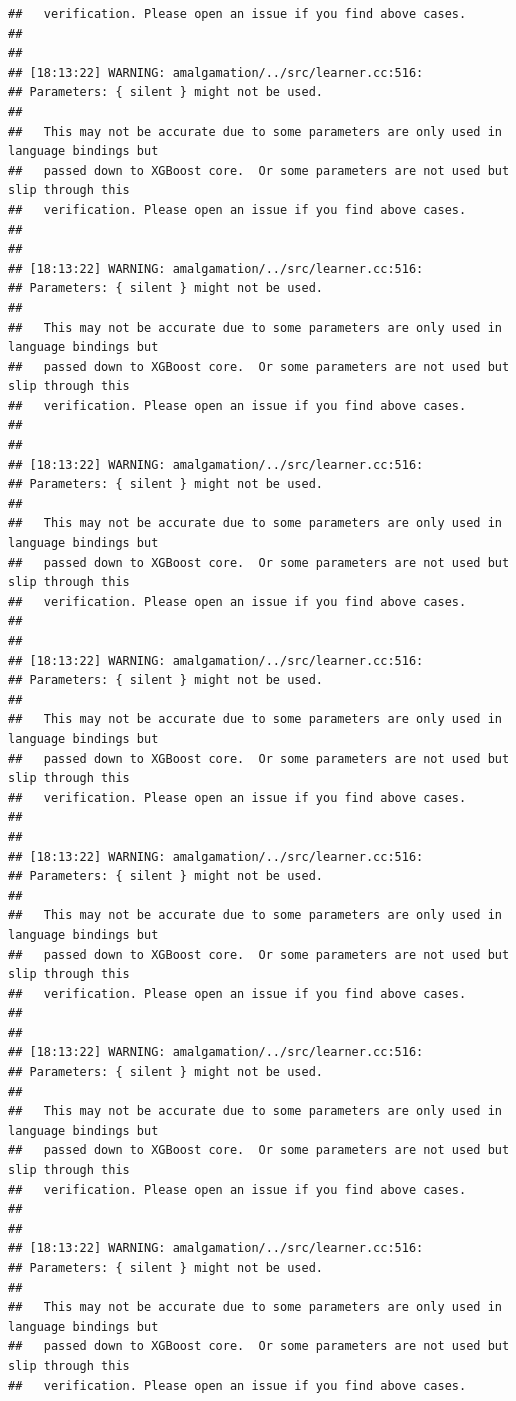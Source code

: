 \documentclass[AMS,STIX2COL]{WileyNJD-v2}\usepackage[]{graphicx}\usepackage[]{color}
\makeatletter
\newenvironment{kframe}{%
 \def\at@end@of@kframe{}%
 \ifinner\ifhmode%
  \def\at@end@of@kframe{\end{minipage}}%
  \begin{minipage}{\columnwidth}%
 \fi\fi%
 \def\FrameCommand##1{\hskip\@totalleftmargin \hskip-\fboxsep
 \colorbox{shadecolor}{##1}\hskip-\fboxsep
     \hskip-\linewidth \hskip-\@totalleftmargin \hskip\columnwidth}%
 \MakeFramed {\advance\hsize-\width
   \@totalleftmargin\z@ \linewidth\hsize
   \@setminipage}}%
 {\par\unskip\endMakeFramed%
 \at@end@of@kframe}
\newenvironment{knitrout}{}{} %
\makeatother
\begin{document}
\begin{knitrout}
\begin{kframe}
\begin{verbatim}
##   verification. Please open an issue if you find above cases.
## 
## 
## [18:13:22] WARNING: amalgamation/../src/learner.cc:516: 
## Parameters: { silent } might not be used.
## 
##   This may not be accurate due to some parameters are only used in language bindings but
##   passed down to XGBoost core.  Or some parameters are not used but slip through this
##   verification. Please open an issue if you find above cases.
## 
## 
## [18:13:22] WARNING: amalgamation/../src/learner.cc:516: 
## Parameters: { silent } might not be used.
## 
##   This may not be accurate due to some parameters are only used in language bindings but
##   passed down to XGBoost core.  Or some parameters are not used but slip through this
##   verification. Please open an issue if you find above cases.
## 
## 
## [18:13:22] WARNING: amalgamation/../src/learner.cc:516: 
## Parameters: { silent } might not be used.
## 
##   This may not be accurate due to some parameters are only used in language bindings but
##   passed down to XGBoost core.  Or some parameters are not used but slip through this
##   verification. Please open an issue if you find above cases.
## 
## 
## [18:13:22] WARNING: amalgamation/../src/learner.cc:516: 
## Parameters: { silent } might not be used.
## 
##   This may not be accurate due to some parameters are only used in language bindings but
##   passed down to XGBoost core.  Or some parameters are not used but slip through this
##   verification. Please open an issue if you find above cases.
## 
## 
## [18:13:22] WARNING: amalgamation/../src/learner.cc:516: 
## Parameters: { silent } might not be used.
## 
##   This may not be accurate due to some parameters are only used in language bindings but
##   passed down to XGBoost core.  Or some parameters are not used but slip through this
##   verification. Please open an issue if you find above cases.
## 
## 
## [18:13:22] WARNING: amalgamation/../src/learner.cc:516: 
## Parameters: { silent } might not be used.
## 
##   This may not be accurate due to some parameters are only used in language bindings but
##   passed down to XGBoost core.  Or some parameters are not used but slip through this
##   verification. Please open an issue if you find above cases.
## 
## 
## [18:13:22] WARNING: amalgamation/../src/learner.cc:516: 
## Parameters: { silent } might not be used.
## 
##   This may not be accurate due to some parameters are only used in language bindings but
##   passed down to XGBoost core.  Or some parameters are not used but slip through this
##   verification. Please open an issue if you find above cases.

\end{verbatim}
\end{kframe}
\end{knitrout}
\end{document}
